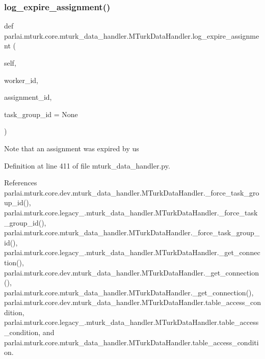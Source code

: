 \subsubsection{\texorpdfstring{log\+\_\+expire\+\_\+assignment()}{log\_expire\_assignment()}}
{\footnotesize\ttfamily def parlai.\+mturk.\+core.\+mturk\+\_\+data\+\_\+handler.\+M\+Turk\+Data\+Handler.\+log\+\_\+expire\+\_\+assignment (\begin{DoxyParamCaption}\item[{}]{self,  }\item[{}]{worker\+\_\+id,  }\item[{}]{assignment\+\_\+id,  }\item[{}]{task\+\_\+group\+\_\+id = {\ttfamily None} }\end{DoxyParamCaption})}

\begin{DoxyVerb}Note that an assignment was expired by us\end{DoxyVerb}
 

Definition at line 411 of file mturk\+\_\+data\+\_\+handler.\+py.



References parlai.\+mturk.\+core.\+dev.\+mturk\+\_\+data\+\_\+handler.\+M\+Turk\+Data\+Handler.\+\_\+force\+\_\+task\+\_\+group\+\_\+id(), parlai.\+mturk.\+core.\+legacy\+\_.\+mturk\+\_\+data\+\_\+handler.\+M\+Turk\+Data\+Handler.\+\_\+force\+\_\+task\+\_\+group\+\_\+id(), parlai.\+mturk.\+core.\+mturk\+\_\+data\+\_\+handler.\+M\+Turk\+Data\+Handler.\+\_\+force\+\_\+task\+\_\+group\+\_\+id(), parlai.\+mturk.\+core.\+legacy\+\_.\+mturk\+\_\+data\+\_\+handler.\+M\+Turk\+Data\+Handler.\+\_\+get\+\_\+connection(), parlai.\+mturk.\+core.\+dev.\+mturk\+\_\+data\+\_\+handler.\+M\+Turk\+Data\+Handler.\+\_\+get\+\_\+connection(), parlai.\+mturk.\+core.\+mturk\+\_\+data\+\_\+handler.\+M\+Turk\+Data\+Handler.\+\_\+get\+\_\+connection(), parlai.\+mturk.\+core.\+dev.\+mturk\+\_\+data\+\_\+handler.\+M\+Turk\+Data\+Handler.\+table\+\_\+access\+\_\+condition, parlai.\+mturk.\+core.\+legacy\+\_.\+mturk\+\_\+data\+\_\+handler.\+M\+Turk\+Data\+Handler.\+table\+\_\+access\+\_\+condition, and parlai.\+mturk.\+core.\+mturk\+\_\+data\+\_\+handler.\+M\+Turk\+Data\+Handler.\+table\+\_\+access\+\_\+condition.

